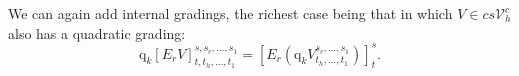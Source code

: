 \documentclass[11pt]{amsart} \renewcommand{\baselinestretch}{1.2}
\theoremstyle{plain}
\newtheorem{cor}[thm]{Corollary}
\theoremstyle{definition}
\DeclareMathOperator{\Tot}{Tot}
\renewcommand{\to}{\longrightarrow}
\newcommand{\scrC}{\mathscr{C}}
\newcommand{\calV}{\mathcal{V}}
\newcommand{\vect}[2]{\calV^{#1}_{#2}}
\newcommand{\quadgrad}[1]{\mathrm{q}_{#1}}
\newcommand{\algs}{{\scrC\!\textit{om}}}
\newcommand{\Edownup}[5]{[E_{#1}^{#2}#3]^{#4}_{#5}}
\begin{document}
\begin{Conventions and notation}
\begin{shaded}
We can again add internal gradings, the richest case being that in which  $V\in cs\vect{c}{h}$ also has a quadratic grading:
\[\quadgrad{k}\Edownup{r}{}{V}{s,s_c,\ldots,s_1}{t,t_h,\ldots,t_1}=\Edownup{r}{}{(\quadgrad{k}V^{s_c,\ldots,s_1}_{t_h,\ldots,t_1})}{s}{t}.\]
\end{shaded}
%
%
%
%
%
%
%


















\end{Conventions and notation}
\end{document}
